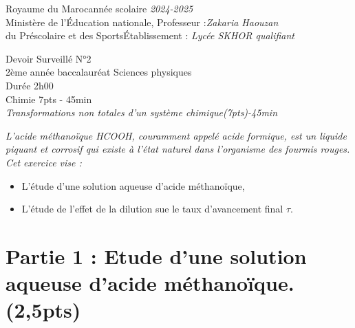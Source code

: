 \documentclass[12pt]{article}
\newcommand\headerMe[2]{\noindent{}#1\hfill#2}
\begin{document}
\headerMe{Royaume du Maroc}{année scolaire \emph{2024-2025}}\\
\headerMe{Ministère de l'Éducation nationale, }{  Professeur :\emph{Zakaria Haouzan}}\\
\headerMe{du Préscolaire et des Sports}{Établissement : \emph{Lycée SKHOR qualifiant}}\\
\begin{center}
	Devoir Surveillé  N°2 \\
	2ème année baccalauréat Sciences physiques\\
	Durée 2h00
	\\
	\vspace{.2cm}
	\hrulefill
	\Large{Chimie 7pts - 45min}
	\hrulefill\\

\emph{Transformations non totales d'un système chimique\dotfill(7pts)-45min }
\end{center}




\emph{L’acide méthanoïque HCOOH, couramment appelé acide formique, est un liquide
	piquant et corrosif qui existe à l’état naturel dans l’organisme des fourmis rouges.
	Cet exercice vise :}
\begin{itemize}
	\item  L’étude d’une solution aqueuse d’acide méthanoïque,
	\item  L’étude de l’effet de la dilution sue le taux d’avancement final $\tau$.
\end{itemize}

\section*{Partie 1 : Etude d’une solution aqueuse d’acide méthanoïque.\\\dotfill(2,5pts) }
\end{document}
